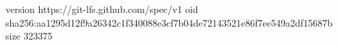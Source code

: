 version https://git-lfs.github.com/spec/v1
oid sha256:aa1295d12f9a26342c1f340088e3cf7b04de72143521e86f7ee549a2df15687b
size 323375
